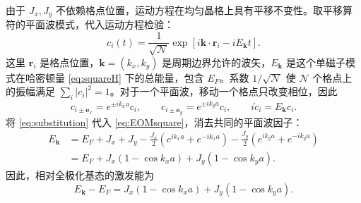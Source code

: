 \documentclass[UTF8,11pt,a4paper,fontset=fandol]{ctexart}
\begin{document}
由于 $J_x,J_y$ 不依赖格点位置，运动方程在均匀晶格上具有平移不变性。取平移算符的平面波模式，代入运动方程检验：
\begin{equation}
c_i(t)=\frac1{\sqrt{\mathcal N}}
\exp\!\left[i\mathbf k\cdot\mathbf r_i-iE_{\mathbf k}t\right].
\label{eq:planewave}
\end{equation}
这里 $\mathbf r_i$ 是格点位置，$\mathbf k=(k_x,k_y)$ 是周期边界允许的波矢，$E_{\mathbf k}$ 是这个单磁子模式在哈密顿量 \eqref{eq:squareH} 下的总能量，包含 $E_F$。系数 $1/\sqrt{\mathcal N}$ 使 $\mathcal N$ 个格点上的振幅满足 $\sum_i|c_i|^2=1$。对于一个平面波，移动一个格点只改变相位，因此
\begin{equation}
c_{i\pm\mathbf e_x}=e^{\pm ik_xa}c_i,\qquad
c_{i\pm\mathbf e_y}=e^{\pm ik_ya}c_i,\qquad
i\dot c_i=E_{\mathbf k}c_i.
\label{eq:substitution}
\end{equation}
将 \eqref{eq:substitution} 代入 \eqref{eq:EOMsquare}，消去共同的平面波因子：
\begin{equation}
\begin{aligned}
E_{\mathbf k}
&=E_F+J_x+J_y
-\frac{J_x}{2}(e^{ik_xa}+e^{-ik_xa})
-\frac{J_y}{2}(e^{ik_ya}+e^{-ik_ya})\\
&=E_F+J_x(1-\cos k_xa)+J_y(1-\cos k_ya).
\end{aligned}
\end{equation}
因此，相对全极化基态的激发能为
\begin{equation}
\boxed{
E_{\mathbf k}-E_F
=J_x(1-\cos k_xa)+J_y(1-\cos k_ya).
}
\end{equation}
\end{document}
